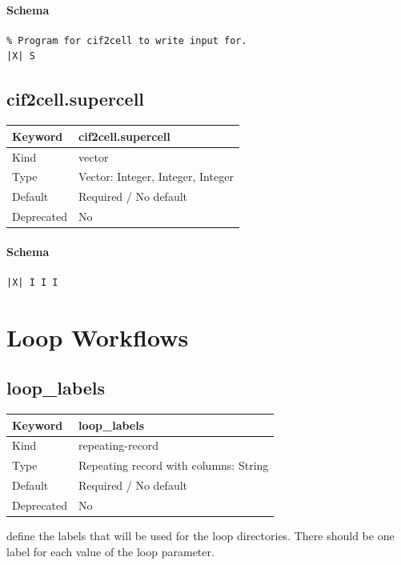 \documentclass[11pt]{article}
\begin{document}
{{{{{\paragraph{Schema}
\begin{Verbatim}
% Program for cif2cell to write input for.
|X| S
\end{Verbatim}

\subsection{cif2cell.supercell}
\label{kw:cif2cell-supercell}
\begin{longtable}{|p{1.5in}|p{4.5in}|}
\hline
Keyword & cif2cell.supercell \\
\hline
Kind & vector \\
\hline
Type & Vector: Integer, Integer, Integer \\
\hline
Default & Required / No default \\
\hline
Deprecated & No \\
\hline
\end{longtable}
\paragraph{Schema}
\begin{Verbatim}
|X| I I I
\end{Verbatim}

\section{Loop Workflows}

\subsection{loop\_labels}
\label{kw:loop-labels}
\begin{longtable}{|p{1.5in}|p{4.5in}|}
\hline
Keyword & loop\_labels \\
\hline
Kind & repeating-record \\
\hline
Type & Repeating record with columns: String \\
\hline
Default & Required / No default \\
\hline
Deprecated & No \\
\hline
\end{longtable}
 define the labels that will be used for the
 loop directories. There should be one label
 for each value of the loop parameter.

}}}}}
\end{document}
